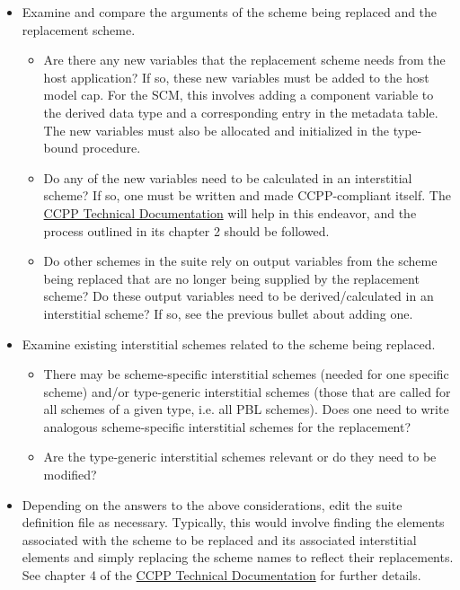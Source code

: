 \begin{itemize}
\item Examine and compare the arguments of the scheme being replaced and the replacement scheme.
\begin{itemize}
\item Are there any new variables that the replacement scheme needs from the host application? If so, these new variables must be added to the host model cap. For the SCM, this involves adding a component variable to the  derived data type and a corresponding entry in the metadata table. The new variables must also be allocated and initialized in the  type-bound procedure.
\item Do any of the new variables need to be calculated in an interstitial scheme? If so, one must be written and made CCPP-compliant itself. The \href{https://ccpp-techdoc.readthedocs.io/en/v4.1.0/}{CCPP Technical Documentation} will help in this endeavor, and the process outlined in its chapter 2 should be followed.
\item Do other schemes in the suite rely on output variables from the scheme being replaced that are no longer being supplied by the replacement scheme? Do these output variables need to be derived/calculated in an interstitial scheme? If so, see the previous bullet about adding one.
\end{itemize}
\item Examine existing interstitial schemes related to the scheme being replaced.
\begin{itemize}
\item There may be scheme-specific interstitial schemes (needed for one specific scheme) and/or type-generic interstitial schemes (those that are called for all schemes of a given type, i.e. all PBL schemes). Does one need to write analogous scheme-specific interstitial schemes for the replacement?
\item Are the type-generic interstitial schemes relevant or do they need to be modified?
\end{itemize}
\item Depending on the answers to the above considerations, edit the suite definition file as necessary. Typically, this would involve finding the  elements associated with the scheme to be replaced and its associated interstitial  elements and simply replacing the scheme names to reflect their replacements. See chapter 4 of the \href{https://ccpp-techdoc.readthedocs.io/en/v4.1.0/}{CCPP Technical Documentation} for further details.
\end{itemize}

